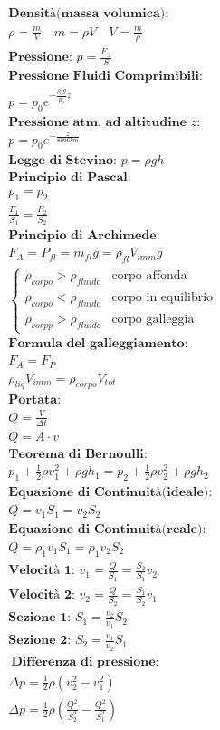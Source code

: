 \begin{gather*}
    \textbf{Densità(massa volumica): } \\ \rho = \frac{m}{V} \quad m = \rho V \quad V = \frac{m}{\rho} \\
    \textbf{Pressione: } p = \frac{F_\perp}{S} \\
    \textbf{Pressione Fluidi Comprimibili: } \\ p = p_0e^{-\frac{\rho_0 g}{p_0}z} \\
    \textbf{Pressione atm. ad altitudine $z$: } \\
    p = p_0e^{-\frac{z}{8006km}} \\
    \textbf{Legge di Stevino: } p = \rho g h \\
    \textbf{Principio di Pascal: } \\ p_1 = p_2 \\ \frac{F_1}{S_1} = \frac{F_2}{S_2} \\
    \textbf{Principio di Archimede: } \\ F_A = P_{fl} = m_{fl} g = \rho_{fl} V_{imm} g \\ \begin{cases}
        \rho_{corpo} > \rho_{fluido} & \text{corpo affonda} \\
        \rho_{corpo} < \rho_{fluido} & \text{corpo in equilibrio} \\
        \rho_{corpp} > \rho_{fluido} & \text{corpo galleggia}
    \end{cases} \\
    \textbf{Formula del galleggiamento: } \\ F_A = F_P \\ \rho_{liq} V_{imm} = \rho_{corpo} V_{tot} \\
    \textbf{Portata: } \\ Q = \frac{V}{\Delta t} \\ Q = A \cdot v \\
    \textbf{Teorema di Bernoulli: } \\ p_1 + \frac{1}{2} \rho v_1^2 + \rho g h_1 = p_2 + \frac{1}{2} \rho v_2^2 + \rho g h_2 \\
    \textbf{Equazione di Continuità(ideale): } \\  Q = v_1 S_1 = v_2 S_2 \\
    \textbf{Equazione di Continuità(reale): } \\ Q = \rho_1 v_1 S_1 = \rho_1 v_2 S_2 \\
    \textbf{Velocità 1: } v_1 = \frac{Q}{S_1} = \frac{S_2}{S_1} v_2 \\
    \textbf{Velocità 2: } v_2 = \frac{Q}{S_2} = \frac{S_1}{S_2} v_1 \\
    \textbf{Sezione 1: } S_1 = \frac{v_2}{v_1} S_2 \\
    \textbf{Sezione 2: } S_2 = \frac{v_1}{v_2} S_1 \\\
    \textbf{Differenza di pressione: } \\
    \Delta p = \frac{1}{2} \rho (v_2^2 - v_1^2) \\ 
    \Delta p = \frac{1}{2} \rho (\frac{Q^2}{S_2^2} - \frac{Q^2}{S_1^2})
\end{gather*}